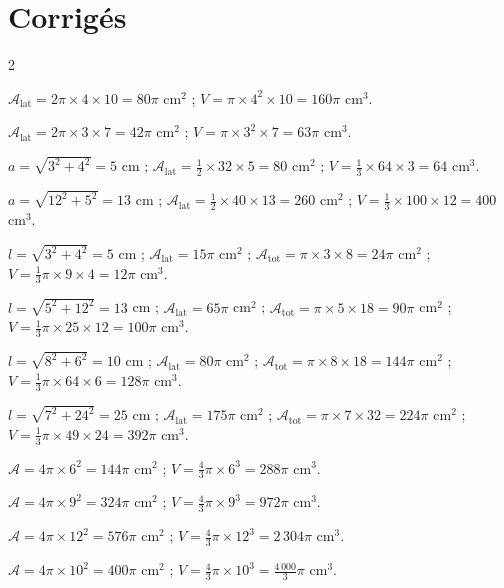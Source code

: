 \section{Corrigés}
\begin{multicols}{2}

$\mathcal{A}_{\text{lat}}=2\pi\times4\times10=80\pi$ cm$^{2}$ ; $V=\pi\times4^{2}\times10=160\pi$ cm$^{3}$.

$\mathcal{A}_{\text{lat}}=2\pi\times3\times7=42\pi$ cm$^{2}$ ; $V=\pi\times3^{2}\times7=63\pi$ cm$^{3}$.

$a=\sqrt{3^{2}+4^{2}}=5$ cm ; $\mathcal{A}_{\text{lat}}=\frac12\times32\times5=80$ cm$^{2}$ ;
$V=\frac13\times64\times3=64$ cm$^{3}$.

$a=\sqrt{12^{2}+5^{2}}=13$ cm ; $\mathcal{A}_{\text{lat}}=\frac12\times40\times13=260$ cm$^{2}$ ;
$V=\frac13\times100\times12=400$ cm$^{3}$.

$l=\sqrt{3^{2}+4^{2}}=5$ cm ; $\mathcal{A}_{\text{lat}}=15\pi$ cm$^{2}$ ; $\mathcal{A}_{\text{tot}}=\pi\times3\times8=24\pi$ cm$^{2}$ ;
$V=\frac13\pi\times9\times4=12\pi$ cm$^{3}$.

$l=\sqrt{5^{2}+12^{2}}=13$ cm ; $\mathcal{A}_{\text{lat}}=65\pi$ cm$^{2}$ ; $\mathcal{A}_{\text{tot}}=\pi\times5\times18=90\pi$ cm$^{2}$ ;
$V=\frac13\pi\times25\times12=100\pi$ cm$^{3}$.

$l=\sqrt{8^{2}+6^{2}}=10$ cm ; $\mathcal{A}_{\text{lat}}=80\pi$ cm$^{2}$ ; $\mathcal{A}_{\text{tot}}=\pi\times8\times18=144\pi$ cm$^{2}$ ;
$V=\frac13\pi\times64\times6=128\pi$ cm$^{3}$.

$l=\sqrt{7^{2}+24^{2}}=25$ cm ; $\mathcal{A}_{\text{lat}}=175\pi$ cm$^{2}$ ; $\mathcal{A}_{\text{tot}}=\pi\times7\times32=224\pi$ cm$^{2}$ ;
$V=\frac13\pi\times49\times24=392\pi$ cm$^{3}$.

$\mathcal{A}=4\pi\times6^{2}=144\pi$ cm$^{2}$ ; $V=\frac43\pi\times6^{3}=288\pi$ cm$^{3}$.

$\mathcal{A}=4\pi\times9^{2}=324\pi$ cm$^{2}$ ; $V=\frac43\pi\times9^{3}=972\pi$ cm$^{3}$.

$\mathcal{A}=4\pi\times12^{2}=576\pi$ cm$^{2}$ ; $V=\frac43\pi\times12^{3}=2\,304\pi$ cm$^{3}$.

$\mathcal{A}=4\pi\times10^{2}=400\pi$ cm$^{2}$ ; $V=\frac43\pi\times10^{3}=\frac{4\,000}{3}\pi$ cm$^{3}$.


\end{multicols}
